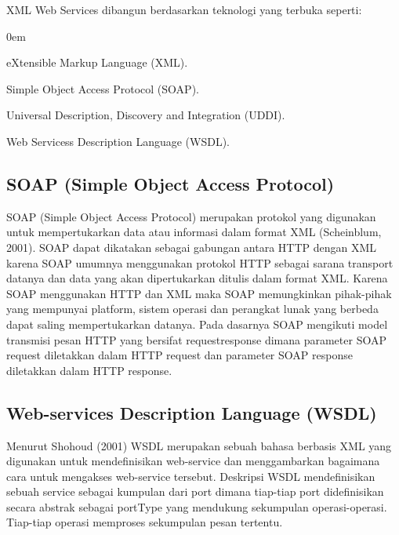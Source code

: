 \documentclass{jtetiproposalskripsi}
\begin{document}
XML Web Services dibangun berdasarkan teknologi yang terbuka seperti: 
\vspace{-0.5cm}
\begin{enumerate}[a.]
\begin{singlespace}
\itemsep0em
\item eXtensible Markup Language (XML).
\item Simple Object Access Protocol  (SOAP). 
\item Universal Description, Discovery and Integration (UDDI).
\item Web Servicess Description Language (WSDL).
\end{singlespace}
\end{enumerate}

\subsection{SOAP (Simple Object Access Protocol)}
SOAP (Simple Object Access Protocol) merupakan protokol yang digunakan untuk mempertukarkan data atau informasi dalam format XML (Scheinblum, 2001). SOAP dapat dikatakan sebagai gabungan antara HTTP dengan XML karena SOAP umumnya menggunakan protokol HTTP sebagai sarana transport datanya dan data yang akan dipertukarkan ditulis dalam  format  XML.  Karena  SOAP  menggunakan  HTTP  dan  XML  maka  SOAP  memungkinkan  pihak-pihak  yang mempunyai platform, sistem operasi dan perangkat lunak yang berbeda dapat saling mempertukarkan datanya. 
Pada dasarnya SOAP mengikuti model transmisi pesan HTTP yang bersifat requestresponse dimana parameter SOAP request diletakkan dalam HTTP request dan parameter SOAP response diletakkan dalam HTTP response.


\subsection{Web-services Description Language (WSDL) }
Menurut Shohoud (2001) WSDL merupakan sebuah bahasa berbasis XML yang digunakan untuk mendefinisikan web-service dan menggambarkan bagaimana cara untuk   mengakses web-service tersebut. Deskripsi WSDL mendefinisikan sebuah  service sebagai  kumpulan  dari port  dimana  tiap-tiap  port  didefinisikan  secara  abstrak  sebagai  portType  yang mendukung sekumpulan operasi-operasi. Tiap-tiap operasi memproses sekumpulan pesan tertentu. 
 
\end{document}
